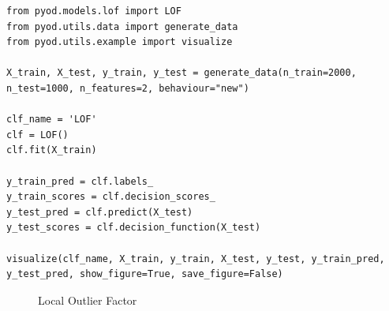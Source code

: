 \documentclass[UTF8]{ctexart}
\begin{document}
\begin{lstlisting}[style=stylePy]
from pyod.models.lof import LOF  
from pyod.utils.data import generate_data
from pyod.utils.example import visualize

X_train, X_test, y_train, y_test = generate_data(n_train=2000, n_test=1000, n_features=2, behaviour="new")

clf_name = 'LOF'
clf = LOF()
clf.fit(X_train)

y_train_pred = clf.labels_ 
y_train_scores = clf.decision_scores_
y_test_pred = clf.predict(X_test) 
y_test_scores = clf.decision_function(X_test) 

visualize(clf_name, X_train, y_train, X_test, y_test, y_train_pred, y_test_pred, show_figure=True, save_figure=False)
\end{lstlisting}

\begin{figure}[htbp]
\centering
{}
\quad
{}
\quad
{}
\quad
{}
\caption{ Local Outlier Factor}
\end{figure}
\end{document}
